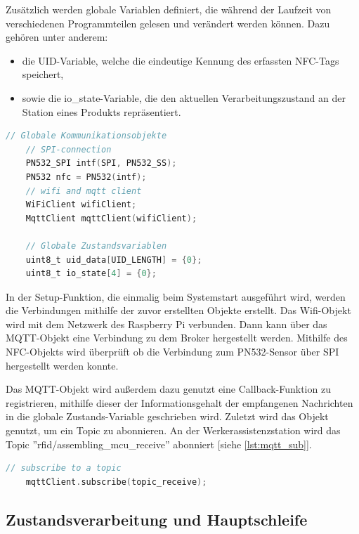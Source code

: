 Zusätzlich werden globale Variablen definiert, die während der Laufzeit von verschiedenen Programmteilen gelesen und verändert werden können. Dazu gehören unter anderem:

\begin{itemize}
	\item die UID-Variable, welche die eindeutige Kennung des erfassten NFC-Tags speichert,
	\item sowie die io\_state-Variable, die den aktuellen Verarbeitungszustand an der Station eines Produkts repräsentiert.
\end{itemize}

\newpage

\begin{lstlisting}[language=C, caption={Initialisierung globaler Objekte und Variablen}, label={lst:init_globals}]
	// Globale Kommunikationsobjekte
	// SPI-connection
	PN532_SPI intf(SPI, PN532_SS);
	PN532 nfc = PN532(intf);
	// wifi and mqtt client 
	WiFiClient wifiClient;
	MqttClient mqttClient(wifiClient);
	
	// Globale Zustandsvariablen
	uint8_t uid_data[UID_LENGTH] = {0};
	uint8_t io_state[4] = {0};
\end{lstlisting}


In der Setup-Funktion, die einmalig beim Systemstart ausgeführt wird, werden die Verbindungen mithilfe der zuvor erstellten Objekte erstellt. Das Wifi-Objekt wird mit dem Netzwerk des Raspberry Pi verbunden. Dann kann über das MQTT-Objekt eine Verbindung zu dem Broker hergestellt werden. Mithilfe des NFC-Objekts wird überprüft ob die Verbindung zum PN532-Sensor über SPI hergestellt werden konnte. 

Das MQTT-Objekt wird außerdem dazu genutzt eine Callback-Funktion zu registrieren, mithilfe dieser der Informationsgehalt der empfangenen Nachrichten in die globale Zustands-Variable geschrieben wird. Zuletzt wird das Objekt genutzt, um ein Topic zu abonnieren. An der Werkerassistenzstation wird das Topic ''rfid/assembling\_mcu\_receive'' abonniert [siehe \autoref{lst:mqtt_sub}]. 

\begin{lstlisting}[language=C, caption={Abonnieren des MQTT-Topics in der Setup-Funktion}, label={lst:mqtt_sub}]
	// subscribe to a topic
	mqttClient.subscribe(topic_receive);
\end{lstlisting}

\subsection{Zustandsverarbeitung und Hauptschleife}

